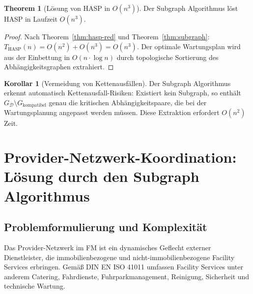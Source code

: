 ﻿\documentclass[a4paper,12pt]{article}
\theoremstyle{definition}
\newtheorem{korollar}{Korollar}[section]
\newtheorem{theorem}{Theorem}[section]
\begin{document}
\begin{theorem}[Lösung von HASP in $O(n^3)$]
\label{thm:hasp-sol}
Der Subgraph Algorithmus löst HASP in Laufzeit $O(n^3)$.
\end{theorem}

\begin{proof}
Nach Theorem~\ref{thm:hasp-red} und Theorem~\ref{thm:subgraph}:
$T_{\mathrm{HASP}}(n) = O(n^2) + O(n^3) = O(n^3)$.
Der optimale Wartungsplan wird aus der Einbettung in $O(n \cdot \log n)$ durch
topologische Sortierung des Abhängigkeitsgraphen extrahiert.
\end{proof}

\begin{korollar}[Vermeidung von Kettenausfällen]
\label{kor:hasp-ketten}
Der Subgraph Algorithmus erkennt automatisch Kettenausfall-Risiken:
Existiert kein Subgraph, so enthält $G_{\mathcal{D}} \setminus G_{\mathrm{kompatibel}}$
genau die kritischen Abhängigkeitspaare, die bei der Wartungsplanung angepasst werden müssen.
Diese Extraktion erfordert $O(n^2)$ Zeit.
\end{korollar}

\section{Provider-Netzwerk-Koordination: Lösung durch den Subgraph Algorithmus}
\label{sec:provider}

\subsection{Problemformulierung und Komplexität}

Das Provider-Netzwerk im FM ist ein dynamisches Geflecht externer Dienstleister,
die immobilienbezogene und nicht-immobilienbezogene Facility Services erbringen.
Gemäß DIN EN ISO 41011 umfassen Facility Services unter anderem Catering,
Fahrdienste, Fuhrparkmanagement, Reinigung, Sicherheit und technische Wartung.
\end{document}
